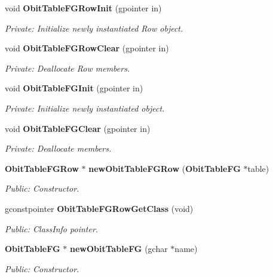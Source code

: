\begin{CompactItemize}
\item 
void {\bf Obit\-Table\-FGRow\-Init} (gpointer in)
\begin{CompactList}\small\item\em Private: Initialize newly instantiated Row object. \item\end{CompactList}\item 
void {\bf Obit\-Table\-FGRow\-Clear} (gpointer in)
\begin{CompactList}\small\item\em Private: Deallocate Row members. \item\end{CompactList}\item 
void {\bf Obit\-Table\-FGInit} (gpointer in)
\begin{CompactList}\small\item\em Private: Initialize newly instantiated object. \item\end{CompactList}\item 
void {\bf Obit\-Table\-FGClear} (gpointer in)
\begin{CompactList}\small\item\em Private: Deallocate members. \item\end{CompactList}\item 
{\bf Obit\-Table\-FGRow} $\ast$ {\bf new\-Obit\-Table\-FGRow} ({\bf Obit\-Table\-FG} $\ast$table)
\begin{CompactList}\small\item\em Public: Constructor. \item\end{CompactList}\item 
gconstpointer {\bf Obit\-Table\-FGRow\-Get\-Class} (void)
\begin{CompactList}\small\item\em Public: Class\-Info pointer. \item\end{CompactList}\item 
{\bf Obit\-Table\-FG} $\ast$ {\bf new\-Obit\-Table\-FG} (gchar $\ast$name)
\begin{CompactList}\small\item\em Public: Constructor. \item\end{CompactList}\item 

\end{CompactItemize}
